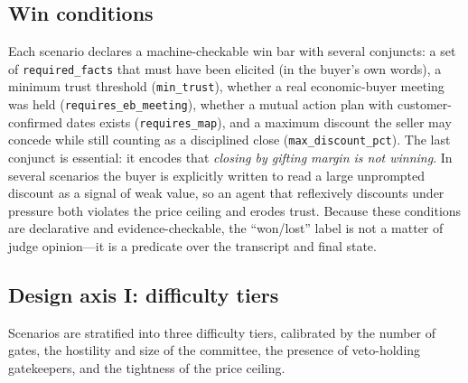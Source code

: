 \subsection{Win conditions}
\label{sec:wincond}
Each scenario declares a machine-checkable win bar with several conjuncts: a set
of \texttt{required\_facts} that must have been elicited (in the buyer's own
words), a minimum trust threshold (\texttt{min\_trust}), whether a real
economic-buyer meeting was held (\texttt{requires\_eb\_meeting}), whether a mutual
action plan with customer-confirmed dates exists (\texttt{requires\_map}), and a
maximum discount the seller may concede while still counting as a disciplined
close (\texttt{max\_discount\_pct}). The last conjunct is essential: it encodes
that \emph{closing by gifting margin is not winning}. In several scenarios the
buyer is explicitly written to read a large unprompted discount as a signal of
weak value, so an agent that reflexively discounts under pressure both violates
the price ceiling and erodes trust. Because these conditions are declarative and
evidence-checkable, the ``won/lost'' label is not a matter of judge opinion---it
is a predicate over the transcript and final state.

\subsection{Design axis I: difficulty tiers}
\label{sec:tiers}
Scenarios are stratified into three difficulty tiers, calibrated by the number of
gates, the hostility and size of the committee, the presence of veto-holding
gatekeepers, and the tightness of the price ceiling.

